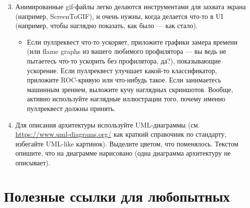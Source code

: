 \documentclass[a5paper]{article}
\begin{document}
\begin{enumerate}
    \setcounter{enumi}{2}
    \item Анимированные gif-файлы легко делаются инструментами для захвата экрана (например, ScreenToGIF), и очень нужны, когда делается что-то в UI (например, чтобы наглядно показать, как было --- как стало). 
    \begin{itemize}
        \item Если пуллреквест что-то ускоряет, приложите графики замера времени (или flame graphs из вашего любимого профилятора --- вы ведь не пытаетесь что-то ускорить без профилятора, да?), показывающие ускорение. Если пуллреквест улучшает какой-то классификатор, приложите ROC-кривую или что-нибудь такое. Если занимаетесь машинным зрением, выложите кучу наглядных скриншотов. Вообще, активно используйте наглядные иллюстрации того, почему именно пуллреквест должны принять.
    \end{itemize}
    \item Для описания архитектуры используйте UML-диаграммы (см. \url{https://www.uml-diagrams.org/} как краткий справочник по стандарту, избегайте UML-like картинок). Выделите цветом, что поменялось. Текстом опишите, что на диаграмме нарисовано (одна диаграмма архитектуру не описывает).
\end{enumerate}

\section*{Полезные ссылки для любопытных}
\end{document}
